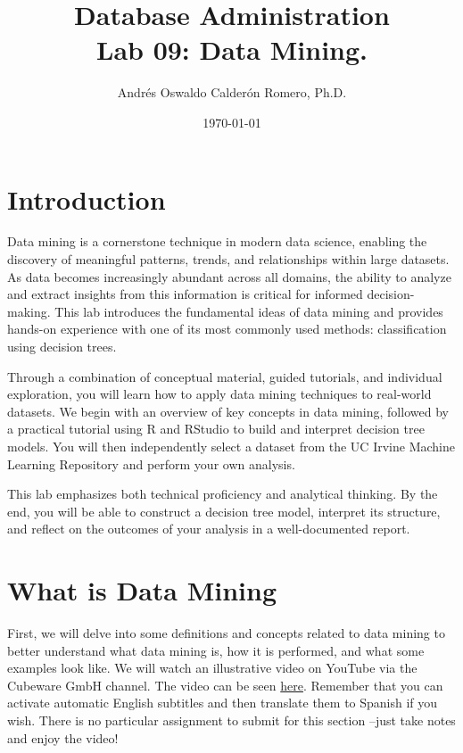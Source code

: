 \documentclass{article}
\title{Database Administration \\ Lab 09: Data Mining.}
\author{Andrés Oswaldo Calderón Romero, Ph.D.}
\date{\today}
\begin{document}
\maketitle

\section{Introduction}

Data mining is a cornerstone technique in modern data science, enabling the discovery of meaningful patterns, trends, and relationships within large datasets. As data becomes increasingly abundant across all domains, the ability to analyze and extract insights from this information is critical for informed decision-making. This lab introduces the fundamental ideas of data mining and provides hands-on experience with one of its most commonly used methods: classification using decision trees.

Through a combination of conceptual material, guided tutorials, and individual exploration, you will learn how to apply data mining techniques to real-world datasets. We begin with an overview of key concepts in data mining, followed by a practical tutorial using R and RStudio to build and interpret decision tree models. You will then independently select a dataset from the UC Irvine Machine Learning Repository and perform your own analysis.

This lab emphasizes both technical proficiency and analytical thinking. By the end, you will be able to construct a decision tree model, interpret its structure, and reflect on the outcomes of your analysis in a well-documented report.

\section{What is Data Mining}
First, we will delve into some definitions and concepts related to data mining to better understand what data mining is, how it is performed, and what some examples look like. We will watch an illustrative video on YouTube via the Cubeware GmbH channel. The video can be seen \href{https://youtu.be/81bm2OsEzbg?si=i3HXb8Gk6tr9bI1l}{here}. Remember that you can activate automatic English subtitles and then translate them to Spanish if you wish. There is no particular assignment to submit for this section --just take notes and enjoy the video!
\end{document}
